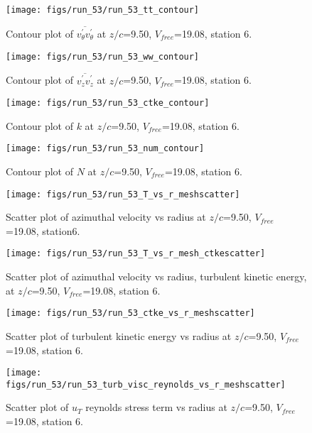 \begin{figure}[H]
\centering
\texttt{[image: figs/run\_53/run\_53\_tt\_contour]}
\caption{Contour plot of $\overline{v_{\theta}^{\prime} v_{\theta}^{\prime}}$ at $z/c$=9.50, $V_{free}$=19.08, station 6.}
\end{figure}


\begin{figure}[H]
\centering
\texttt{[image: figs/run\_53/run\_53\_ww\_contour]}
\caption{Contour plot of $\overline{v_{z}^{\prime} v_{z}^{\prime}}$ at $z/c$=9.50, $V_{free}$=19.08, station 6.}
\end{figure}


\begin{figure}[H]
\centering
\texttt{[image: figs/run\_53/run\_53\_ctke\_contour]}
\caption{Contour plot of $k$ at $z/c$=9.50, $V_{free}$=19.08, station 6.}
\end{figure}


\begin{figure}[H]
\centering
\texttt{[image: figs/run\_53/run\_53\_num\_contour]}
\caption{Contour plot of $N$ at $z/c$=9.50, $V_{free}$=19.08, station 6.}
\end{figure}


\begin{figure}[H]
\centering
\texttt{[image: figs/run\_53/run\_53\_T\_vs\_r\_meshscatter]}
\caption{Scatter plot of azimuthal velocity vs radius at $z/c$=9.50, $V_{free}$=19.08, station6.}
\end{figure}


\begin{figure}[H]
\centering
\texttt{[image: figs/run\_53/run\_53\_T\_vs\_r\_mesh\_ctkescatter]}
\caption{Scatter plot of azimuthal velocity vs radius, turbulent kinetic energy, at $z/c$=9.50, $V_{free}$=19.08, station 6.}
\end{figure}


\begin{figure}[H]
\centering
\texttt{[image: figs/run\_53/run\_53\_ctke\_vs\_r\_meshscatter]}
\caption{Scatter plot of turbulent kinetic energy vs radius at $z/c$=9.50, $V_{free}$=19.08, station 6.}
\end{figure}


\begin{figure}[H]
\centering
\texttt{[image: figs/run\_53/run\_53\_turb\_visc\_reynolds\_vs\_r\_meshscatter]}
\caption{Scatter plot of $
u_T$ reynolds stress term vs radius at $z/c$=9.50, $V_{free}$=19.08, station 6.}
\end{figure}



